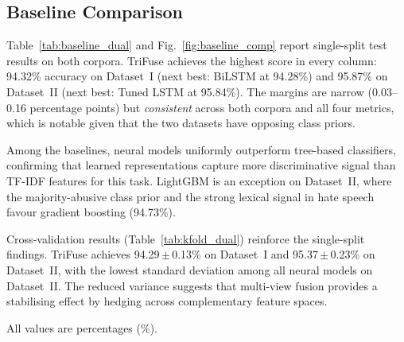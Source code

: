 \documentclass[10pt,twocolumn,a4paper]{article}
\begin{document}
\subsection{Baseline Comparison}\label{subsec:quant}

Table~\ref{tab:baseline_dual} and Fig.~\ref{fig:baseline_comp} report single-split test results on both corpora. TriFuse achieves the highest score in every column: 94.32\% accuracy on Dataset~I (next best: BiLSTM at 94.28\%) and 95.87\% on Dataset~II (next best: Tuned LSTM at 95.84\%). The margins are narrow (0.03--0.16 percentage points) but \emph{consistent} across both corpora and all four metrics, which is notable given that the two datasets have opposing class priors.

Among the baselines, neural models uniformly outperform tree-based classifiers, confirming that learned representations capture more discriminative signal than TF-IDF features for this task. LightGBM is an exception on Dataset~II, where the majority-abusive class prior and the strong lexical signal in hate speech favour gradient boosting (94.73\%).

Cross-validation results (Table~\ref{tab:kfold_dual}) reinforce the single-split findings. TriFuse achieves 94.29\,$\pm$\,0.13\% on Dataset~I and 95.37\,$\pm$\,0.23\% on Dataset~II, with the lowest standard deviation among all neural models on Dataset~II. The reduced variance suggests that multi-view fusion provides a stabilising effect by hedging across complementary feature spaces.

\begin{table}[!t]
\caption{Baseline comparison: single-split test results.}
\label{tab:baseline_dual}
\centering
{}

\smallskip
{\scriptsize All values are percentages (\%).}
\end{table}
\end{document}
